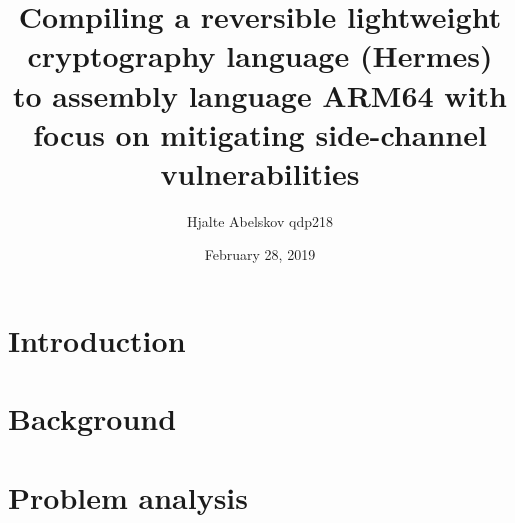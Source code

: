 \documentclass[a4paper,10pt,openright]{memoir}
\title{Compiling a reversible lightweight cryptography language (Hermes) to assembly language ARM64 with focus on mitigating side-channel vulnerabilities}
\author{Hjalte Abelskov qdp218}
\date{February 28, 2019} %
\begin{document}
\maketitle
{}
\setcounter{page}{3}

\cleardoublepage
\pagestyle{plain}
\begin{abstract}

\end{abstract}

\clearpage
\begin{resume}

\end{resume}

\setcounter{tocdepth}{1} %
\cleardoublepage
{}
\tableofcontents*

\cleardoublepage
{}
\setcounter{page}{1}

\chapter{Introduction}

%


\chapter{Background}
\label{chapt - Reversible-computing}



\label{chapt - Side-channel}







\chapter{Problem analysis}

\end{document}
